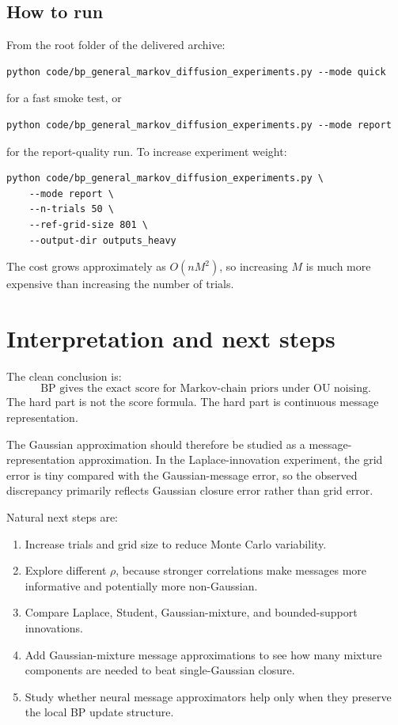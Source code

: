 \documentclass[11pt]{article}
\begin{document}
\subsection{How to run}

From the root folder of the delivered archive:
\begin{lstlisting}[style=pythonstyle]
python code/bp_general_markov_diffusion_experiments.py --mode quick
\end{lstlisting}
for a fast smoke test, or
\begin{lstlisting}[style=pythonstyle]
python code/bp_general_markov_diffusion_experiments.py --mode report
\end{lstlisting}
for the report-quality run. To increase experiment weight:
\begin{lstlisting}[style=pythonstyle]
python code/bp_general_markov_diffusion_experiments.py \
    --mode report \
    --n-trials 50 \
    --ref-grid-size 801 \
    --output-dir outputs_heavy
\end{lstlisting}
The cost grows approximately as \(O(nM^2)\), so increasing \(M\) is much more expensive than increasing the number of trials.

\section{Interpretation and next steps}

The clean conclusion is:
\[
\boxed{\text{BP gives the exact score for Markov-chain priors under OU noising.}}
\]
The hard part is not the score formula. The hard part is continuous message representation.

The Gaussian approximation should therefore be studied as a message-representation approximation. In the Laplace-innovation experiment, the grid error is tiny compared with the Gaussian-message error, so the observed discrepancy primarily reflects Gaussian closure error rather than grid error.

Natural next steps are:
\begin{enumerate}[label=\arabic*.]
  \item Increase trials and grid size to reduce Monte Carlo variability.
  \item Explore different \(\rho\), because stronger correlations make messages more informative and potentially more non-Gaussian.
  \item Compare Laplace, Student, Gaussian-mixture, and bounded-support innovations.
  \item Add Gaussian-mixture message approximations to see how many mixture components are needed to beat single-Gaussian closure.
  \item Study whether neural message approximators help only when they preserve the local BP update structure.
\end{enumerate}
\end{document}

